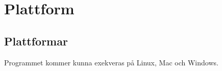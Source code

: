 \section{Plattform}

\subsection{Plattformar}
Programmet kommer kunna exekveras på Linux, Mac och Windows.